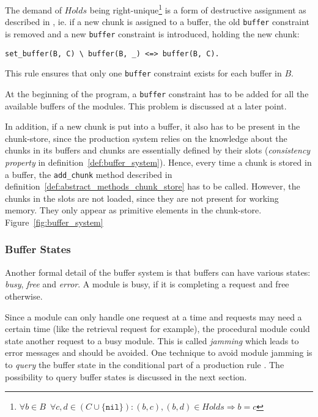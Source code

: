 The demand of $Holds$ being right-unique\footnote{$\forall b \in B \enspace \forall c, d \in (C \cup \{ \mathtt{nil} \}): (b,c), (b,d) \in Holds \Rightarrow b = c$} is a form of destructive assignment as described in \cite[p. 32]{fru_chr_book_2009}, ie. if a new chunk is assigned to a buffer, the old \verb|buffer| constraint is removed and a new \verb|buffer| constraint is introduced, holding the new chunk:

\begin{lstlisting}
set_buffer(B, C) \ buffer(B, _) <=> buffer(B, C).
\end{lstlisting}

This rule ensures that only one \verb|buffer| constraint exists for each buffer in $B$.

At the beginning of the program, a \verb|buffer| constraint has to be added for all the available buffers of the modules. This problem is discussed at a later point. 

In addition, if a new chunk is put into a buffer, it also has to be present in the chunk-store, since the production system relies on the knowledge about the chunks in its buffers and chunks are essentially defined by their slots (\emph{consistency property} in definition~\ref{def:buffer_system}). Hence, every time a chunk is stored in a buffer, the \verb|add_chunk| method described in definition~\ref{def:abstract_methods_chunk_store} has to be called. However, the chunks in the slots are not loaded, since they are not present for working memory. They only appear as primitive elements in the chunk-store. Figure~\ref{fig:buffer_system}


\subsubsection{Buffer States}

Another formal detail of the buffer system is that buffers can have various states: \emph{busy}, \emph{free} and \emph{error}. A module is busy, if it is completing a request and free otherwise.

Since a module can only handle one request at a time and requests may need a certain time (like the retrieval request for example), the procedural module could state another request to a busy module. This is called \emph{jamming} which leads to error messages and should be avoided. One technique to avoid module jamming is to \emph{query} the buffer state in the conditional part of a production rule \cite[unit 2, p. 9]{actr_tutorial}. The possibility to query buffer states is discussed in the next section.

